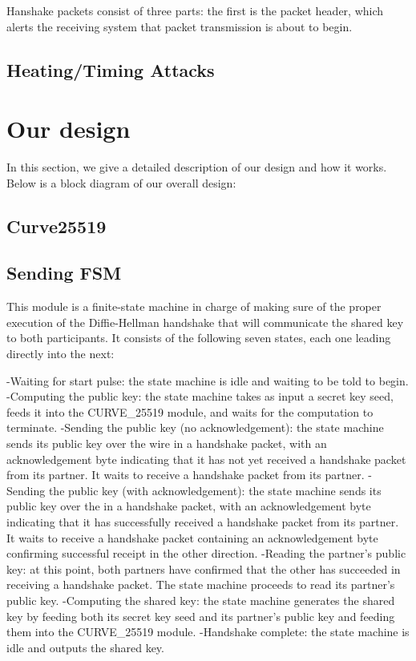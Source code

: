 \documentclass[a4paper]{article}
\begin{document}
Hanshake packets consist of three parts: the first is the packet header, which alerts the receiving system that packet transmission is about to begin.

\subsection{Heating/Timing Attacks}


\section{Our design}

In this section, we give a detailed description of our design and how it works. Below is a block diagram of our overall design:


\subsection{Curve25519}


\subsection{Sending FSM}

This module is a finite-state machine in charge of making sure of the proper execution of the Diffie-Hellman handshake that will communicate the shared key to both participants. It consists of the following seven states, each one leading directly into the next:

-Waiting for start pulse: the state machine is idle and waiting to be told to begin.
-Computing the public key: the state machine takes as input a secret key seed, feeds it into the CURVE_25519 module, and waits for the computation to terminate.
-Sending the public key (no acknowledgement): the state machine sends its public key over the wire in a handshake packet, with an acknowledgement byte indicating that it has not yet received a handshake packet from its partner. It waits to receive a handshake packet from its partner.
-Sending the public key (with acknowledgement): the state machine sends its public key over the in a handshake packet, with an acknowledgement byte indicating that it has successfully received a handshake packet from its partner. It waits to receive a handshake packet containing an acknowledgement byte confirming successful receipt in the other direction.
-Reading the partner's public key: at this point, both partners have confirmed that the other has succeeded in receiving a handshake packet. The state machine proceeds to read its partner's public key. 
-Computing the shared key: the state machine generates the shared key by feeding both its secret key seed and its partner's public key and feeding them into the CURVE_25519 module.
-Handshake complete: the state machine is idle and outputs the shared key.
\end{document}
